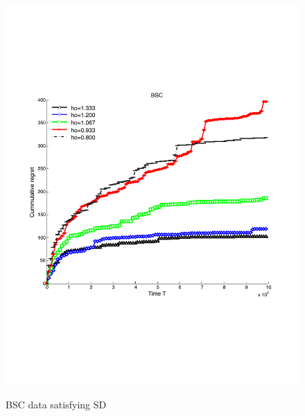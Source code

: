 \begin{figure}[!bt]
	\begin{minipage}{4cm}
		\centering
		\vspace{.5cm}
		\includegraphics[scale=0.21]{../Simulations/Figures/BSC_SD}
		\label{fig:BSC_SD}
		\vspace{-.2cm}
		\caption{BSC data satisfying SD}
	\end{minipage}
	\begin{minipage}{4cm}
		\centering

\end{minipage}
\end{figure}
